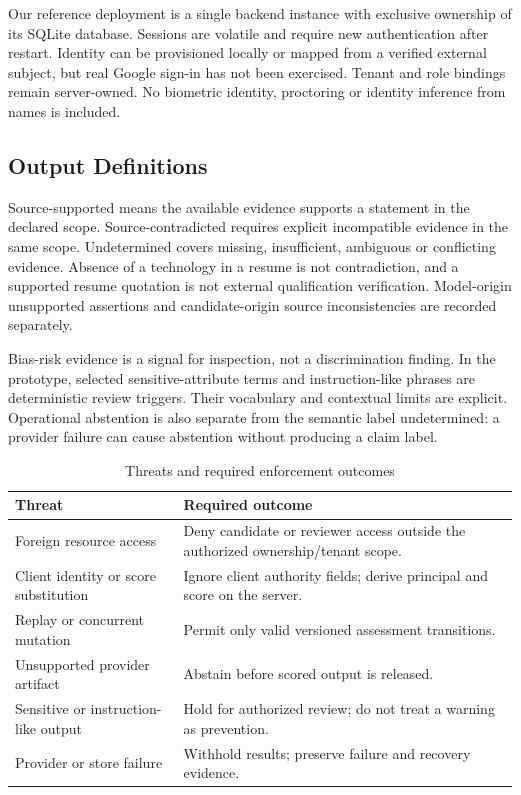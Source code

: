 \documentclass[conference]{IEEEtran}
\begin{document}
Our reference deployment is a single backend instance with exclusive ownership of its SQLite database. Sessions are volatile and require new authentication after restart. Identity can be provisioned locally or mapped from a verified external subject, but real Google sign-in has not been exercised. Tenant and role bindings remain server-owned. No biometric identity, proctoring or identity inference from names is included.

\subsection{Output Definitions}
Source-supported means the available evidence supports a statement in the declared scope. Source-contradicted requires explicit incompatible evidence in the same scope. Undetermined covers missing, insufficient, ambiguous or conflicting evidence. Absence of a technology in a resume is not contradiction, and a supported resume quotation is not external qualification verification. Model-origin unsupported assertions and candidate-origin source inconsistencies are recorded separately.

Bias-risk evidence is a signal for inspection, not a discrimination finding. In the prototype, selected sensitive-attribute terms and instruction-like phrases are deterministic review triggers. Their vocabulary and contextual limits are explicit. Operational abstention is also separate from the semantic label undetermined: a provider failure can cause abstention without producing a claim label.

\begin{table}[t]
\caption{Threats and required enforcement outcomes}
\label{tab:threats}
\centering
\begin{tabular}{@{}L{0.29\columnwidth}L{0.64\columnwidth}@{}}
\toprule
Threat & Required outcome \\
\midrule
Foreign resource access & Deny candidate or reviewer access outside the authorized ownership/tenant scope. \\
Client identity or score substitution & Ignore client authority fields; derive principal and score on the server. \\
Replay or concurrent mutation & Permit only valid versioned assessment transitions. \\
Unsupported provider artifact & Abstain before scored output is released. \\
Sensitive or instruction-like output & Hold for authorized review; do not treat a warning as prevention. \\
Provider or store failure & Withhold results; preserve failure and recovery evidence. \\
\bottomrule
\end{tabular}
\end{table}
\end{document}
